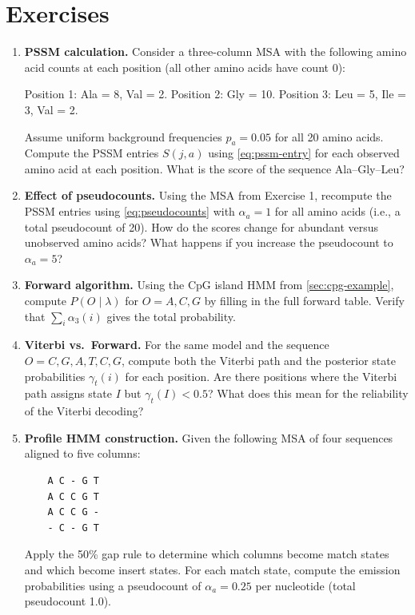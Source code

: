 \section{Exercises}
\label{sec:ch4-exercises}

\begin{enumerate}
  \item \textbf{PSSM calculation.}
  Consider a three-column MSA with the following amino acid counts at each position (all other amino acids have count 0):

  Position 1: Ala = 8, Val = 2.
  Position 2: Gly = 10.
  Position 3: Leu = 5, Ile = 3, Val = 2.

  Assume uniform background frequencies $p_a = 0.05$ for all 20 amino acids.
  Compute the PSSM entries $S(j, a)$ using \cref{eq:pssm-entry} for each observed amino acid at each position.
  What is the score of the sequence Ala--Gly--Leu?

  \item \textbf{Effect of pseudocounts.}
  Using the MSA from Exercise 1, recompute the PSSM entries using \cref{eq:pseudocounts} with $\alpha_a = 1$ for all amino acids (i.e., a total pseudocount of 20).
  How do the scores change for abundant versus unobserved amino acids?
  What happens if you increase the pseudocount to $\alpha_a = 5$?

  \item \textbf{Forward algorithm.}
  Using the CpG island HMM from \cref{sec:cpg-example}, compute $P(O \mid \lambda)$ for $O = A, C, G$ by filling in the full forward table.
  Verify that $\sum_i \alpha_3(i)$ gives the total probability.

  \item \textbf{Viterbi vs.\ Forward.}
  For the same model and the sequence $O = C, G, A, T, C, G$, compute both the Viterbi path and the posterior state probabilities $\gamma_t(i)$ for each position.
  Are there positions where the Viterbi path assigns state $I$ but $\gamma_t(I) < 0.5$?
  What does this mean for the reliability of the Viterbi decoding?

  \item \textbf{Profile HMM construction.}
  Given the following MSA of four sequences aligned to five columns:
  \begin{verbatim}
    A C - G T
    A C C G T
    A C C G -
    - C - G T
  \end{verbatim}
  Apply the 50\% gap rule to determine which columns become match states and which become insert states.
  For each match state, compute the emission probabilities using a pseudocount of $\alpha_a = 0.25$ per nucleotide (total pseudocount 1.0).


\end{enumerate}
